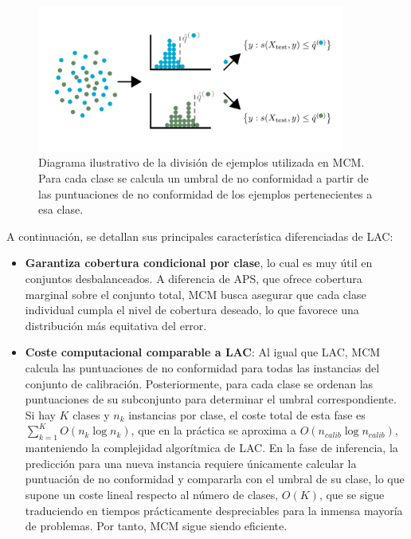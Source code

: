 \begin{figure}[h]
    \centering
    \includegraphics[width=0.9\textwidth]{capitulos/cap_04/imagenes/mondrian_diagram.png}
    \caption[
        Diagrama ilustrativo de la división de ejemplos utilizada en MCM.
    ]{
        Diagrama ilustrativo de la división de ejemplos utilizada en \acrshort{MCM}. Para cada clase se calcula un umbral de no conformidad a partir de las puntuaciones de no conformidad de los ejemplos pertenecientes a esa clase.
    }
    \label{fig:mondrian_diagram}
\end{figure}

A continuación, se detallan sus principales característica diferenciadas de \acrshort{LAC}:

\begin{itemize}

    \item \textbf{Garantiza cobertura condicional por clase}, lo cual es muy útil en conjuntos desbalanceados. A diferencia de \acrshort{APS}, que ofrece cobertura marginal sobre el conjunto total, MCM busca asegurar que cada clase individual cumpla el nivel de cobertura deseado, lo que favorece una distribución más equitativa del error.

    \item \textbf{Coste computacional comparable a \acrshort{LAC}}: Al igual que LAC, MCM calcula las puntuaciones de no conformidad para todas las instancias del conjunto de calibración. Posteriormente, para cada clase se ordenan las puntuaciones de su subconjunto para determinar el umbral correspondiente. Si hay $K$ clases y $n_k$ instancias por clase, el coste total de esta fase es $\sum_{k=1}^{K} O(n_k \log n_k)$, que en la práctica se aproxima a $O(n_{calib} \log n_{calib})$, manteniendo la complejidad algorítmica de LAC. En la fase de inferencia, la predicción para una nueva instancia requiere únicamente calcular la puntuación de no conformidad y compararla con el umbral de su clase, lo que supone un coste lineal respecto al número de clases, $O(K)$, que se sigue traduciendo en tiempos prácticamente despreciables para la inmensa mayoría de problemas. Por tanto, MCM sigue siendo eficiente.

\end{itemize}

